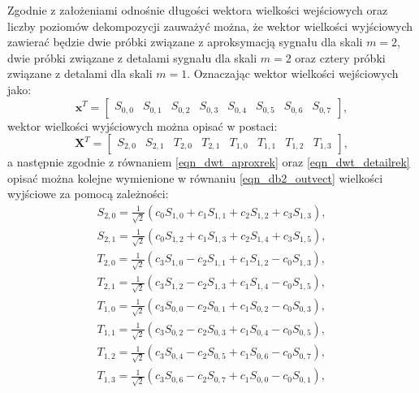 Zgodnie z założeniami odnośnie długości wektora wielkości wejściowych oraz liczby poziomów dekompozycji zauważyć można, że wektor wielkości wyjściowych zawierać będzie dwie próbki związane z aproksymacją sygnału dla skali $m = 2$, dwie próbki związane z detalami sygnału dla skali $m = 2$ oraz cztery próbki związane z detalami dla skali $m = 1$. Oznaczając wektor wielkości wejściowych jako:
\begin{equation}
\mathbf{x}^{T} =
\begin{bmatrix}
S_{0,0} & S_{0,1} & S_{0,2} & S_{0,3} & S_{0,4} & S_{0,5} & S_{0,6} & S_{0,7}
\end{bmatrix}
\label{eqn_db2_invect},
\end{equation}
wektor wielkości wyjściowych można opisać w postaci:
\begin{equation}
\mathbf{X}^{T} =
\begin{bmatrix}
S_{2,0} & S_{2,1} & T_{2,0} & T_{2,1} & T_{1,0} & T_{1,1} & T_{1,2} & T_{1,3}
\end{bmatrix}
\label{eqn_db2_outvect},
\end{equation}
a następnie zgodnie z równaniem \eqref{eqn_dwt_aproxrek} oraz \eqref{eqn_dwt_detailrek} opisać można kolejne wymienione w równaniu \eqref{eqn_db2_outvect} wielkości wyjściowe za pomocą zależności:
\begin{gather}
S_{2,0} = \frac{1}{\sqrt{2}} \left( c_{0} S_{1,0} + c_{1} S_{1,1} + c_{2} S_{1,2} + c_{3} S_{1,3} \right) \label{eqn_db2_outvect_s_2_0}, \\
S_{2,1} = \frac{1}{\sqrt{2}} \left( c_{0} S_{1,2} + c_{1} S_{1,3} + c_{2} S_{1,4} + c_{3} S_{1,5} \right) \label{eqn_db2_outvect_s_2_1}, \\
T_{2,0} = \frac{1}{\sqrt{2}} \left( c_{3} S_{1,0} - c_{2} S_{1,1} + c_{1} S_{1,2} - c_{0} S_{1,3} \right) \label{eqn_db2_outvect_t_2_0}, \\
T_{2,1} = \frac{1}{\sqrt{2}} \left( c_{3} S_{1,2} - c_{2} S_{1,3} + c_{1} S_{1,4} - c_{0} S_{1,5} \right) \label{eqn_db2_outvect_t_2_1}, \\
T_{1,0} = \frac{1}{\sqrt{2}} \left( c_{3} S_{0,0} - c_{2} S_{0,1} + c_{1} S_{0,2} - c_{0} S_{0,3} \right) \label{eqn_db2_outvect_t_1_0}, \\
T_{1,1} = \frac{1}{\sqrt{2}} \left( c_{3} S_{0,2} - c_{2} S_{0,3} + c_{1} S_{0,4} - c_{0} S_{0,5} \right) \label{eqn_db2_outvect_t_1_1}, \\
T_{1,2} = \frac{1}{\sqrt{2}} \left( c_{3} S_{0,4} - c_{2} S_{0,5} + c_{1} S_{0,6} - c_{0} S_{0,7} \right) \label{eqn_db2_outvect_t_1_2}, \\
T_{1,3} = \frac{1}{\sqrt{2}} \left( c_{3} S_{0,6} - c_{2} S_{0,7} + c_{1} S_{0,0} - c_{0} S_{0,1} \right) \label{eqn_db2_outvect_t_1_3},
\end{gather}
